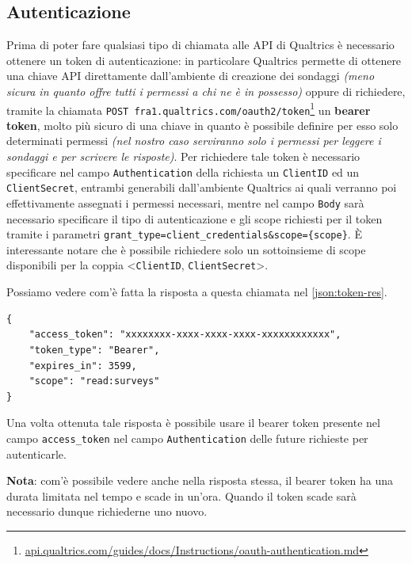 \subsection{Autenticazione}
Prima di poter fare qualsiasi tipo di chiamata alle API di Qualtrics è necessario ottenere un token di autenticazione: in particolare Qualtrics permette di ottenere una chiave API direttamente dall'ambiente di creazione dei sondaggi \textit{(meno sicura in quanto offre tutti i permessi a chi ne è in possesso)} oppure di richiedere, tramite la chiamata \texttt{POST fra1.qualtrics.com/oauth2/token}\footnote{\url{api.qualtrics.com/guides/docs/Instructions/oauth-authentication.md}} un \textbf{bearer token}, molto più sicuro di una chiave in quanto è possibile definire per esso solo determinati permessi \textit{(nel nostro caso serviranno solo i permessi per leggere i sondaggi e per scrivere le risposte)}.
Per richiedere tale token è necessario specificare nel campo \texttt{Authentication} della richiesta un \texttt{ClientID} ed un \texttt{ClientSecret}, entrambi generabili dall'ambiente Qualtrics ai quali verranno poi effettivamente assegnati i permessi necessari, mentre nel campo \texttt{Body} sarà necessario specificare il tipo di autenticazione e gli scope richiesti per il token tramite i parametri \texttt{grant\_type=client\_credentials\&scope=\{scope\}}. È interessante notare che è possibile richiedere solo un sottoinsieme di scope disponibili per la coppia <\texttt{ClientID}, \texttt{ClientSecret}>.

Possiamo vedere com'è fatta la risposta a questa chiamata nel \autoref{json:token-res}.

\begin{json}
\begin{verbatim}
{
	"access_token": "xxxxxxxx-xxxx-xxxx-xxxx-xxxxxxxxxxxx",
	"token_type": "Bearer",
	"expires_in": 3599,
	"scope": "read:surveys"
}
\end{verbatim}
\caption{Risposta a chiamata /oauth2/token}
\label{json:token-res}
\end{json}

Una volta ottenuta tale risposta è possibile usare il bearer token presente nel campo \texttt{access\_token} nel campo \texttt{Authentication} delle future richieste per autenticarle.

\textbf{Nota}: com'è possibile vedere anche nella risposta stessa, il bearer token ha una durata limitata nel tempo e scade in un'ora. Quando il token scade sarà necessario dunque richiederne uno nuovo.

